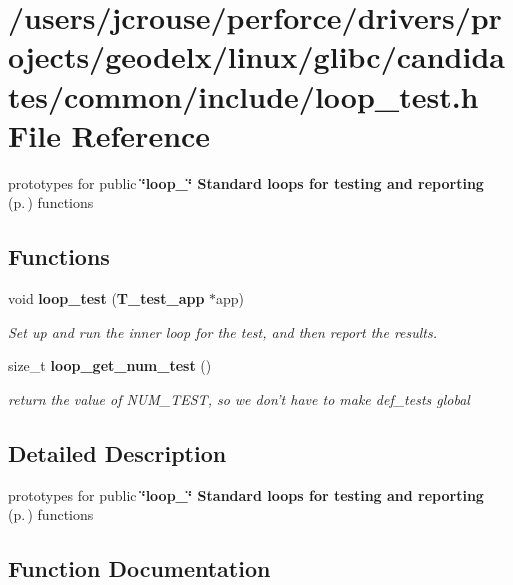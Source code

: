 \section{/users/jcrouse/perforce/drivers/projects/geodelx/linux/glibc/candidates/common/include/loop\_\-test.h File Reference}
\label{loop__test_8h}
prototypes for public {\bf \char`\"{}loop\_\-\char`\"{} Standard loops for testing and reporting} {\rm (p.\,\pageref{group__loop__test})} functions 


\subsection*{Functions}
\begin{CompactItemize}
\item 
void {\bf loop\_\-test} ({\bf T\_\-test\_\-app} $\ast$app)
\begin{CompactList}\small\item\em Set up and run the inner loop for the test, and then report the results.\item\end{CompactList}\item 
size\_\-t {\bf loop\_\-get\_\-num\_\-test} ()
\begin{CompactList}\small\item\em return the value of NUM\_\-TEST, so we don't have to make def\_\-tests global\item\end{CompactList}\end{CompactItemize}


\subsection{Detailed Description}
prototypes for public {\bf \char`\"{}loop\_\-\char`\"{} Standard loops for testing and reporting} {\rm (p.\,\pageref{group__loop__test})} functions





\subsection{Function Documentation}
